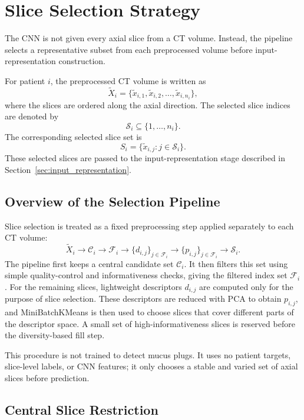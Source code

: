 \section{Slice Selection Strategy}
\label{sec:slice_selection_strategy}

The CNN is not given every axial slice from a CT volume. Instead, the pipeline selects a representative subset from each preprocessed volume before input-representation construction.

For patient \(i\), the preprocessed CT volume is written as
\[
\tilde{X}_i =
\{\tilde{x}_{i,1}, \tilde{x}_{i,2}, \dots, \tilde{x}_{i,n_i}\},
\]
where the slices are ordered along the axial direction. The selected slice indices are denoted by
\[
\mathcal{S}_i \subseteq \{1,\dots,n_i\}.
\]
The corresponding selected slice set is
\[
S_i =
\{\tilde{x}_{i,j}: j \in \mathcal{S}_i\}.
\]
These selected slices are passed to the input-representation stage described in Section~\ref{sec:input_representation}.



\subsection{Overview of the Selection Pipeline}
\label{sec:overview_selection_pipeline}

Slice selection is treated as a fixed preprocessing step applied separately to each CT volume:
\[
\tilde{X}_i
\rightarrow
\mathcal{C}_i
\rightarrow
\mathcal{F}_i
\rightarrow
\{d_{i,j}\}_{j \in \mathcal{F}_i}
\rightarrow
\{p_{i,j}\}_{j \in \mathcal{F}_i}
\rightarrow
\mathcal{S}_i.
\]
The pipeline first keeps a central candidate set \(\mathcal{C}_i\). It then filters this set using simple quality-control and informativeness checks, giving the filtered index set \(\mathcal{F}_i\). For the remaining slices, lightweight descriptors \(d_{i,j}\) are computed only for the purpose of slice selection. These descriptors are reduced with PCA to obtain \(p_{i,j}\), and MiniBatchKMeans is then used to choose slices that cover different parts of the descriptor space. A small set of high-informativeness slices is reserved before the diversity-based fill step.

This procedure is not trained to detect mucus plugs. It uses no patient targets, slice-level labels, or CNN features; it only chooses a stable and varied set of axial slices before prediction.


\subsection{Central Slice Restriction}
\label{sec:central_slice_restriction}

